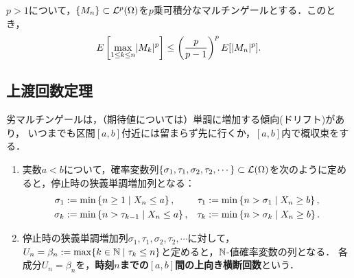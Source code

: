\documentclass[uplatex,dvipdfmx]{jsreport}
\begin{document}
\begin{proposition}
    $p>1$について，$\{M_n\}\subset\mathcal{L}^p(\Omega)$を$p$乗可積分なマルチンゲールとする．このとき，
    \[E\left[\max_{1\le k\le n}\lvert M_k\rvert^p\right]\le\left(\frac{p}{p-1}\right)^pE[\lvert M_n\rvert^p].\]
\end{proposition}

\subsection{上渡回数定理}

\begin{tcolorbox}[colframe=ForestGreen, colback=ForestGreen!10!white,breakable,colbacktitle=ForestGreen!40!white,coltitle=black,fonttitle=\bfseries\sffamily,
    title=]
    劣マルチンゲールは，（期待値については）単調に増加する傾向(ドリフト)があり，
    いつまでも区間$[a,b]$付近には留まらず先に行くか，$[a,b]$内で概収束をする．
\end{tcolorbox}

\begin{definition}\mbox{}
    \begin{enumerate}
        \item 実数$a<b$について，確率変数列$\{\sigma_1,\tau_1,\sigma_2,\tau_2,\cdots\}\subset\mathcal{L}(\Omega)$を次のように定めると，停止時の狭義単調増加列となる：
        \begin{align*}
            \sigma_1&:=\min\left\{n\ge 1\mid X_n\le a\right\},&\tau_1&:=\min\left\{n>\sigma_1\mid X_n\ge b\right\},\\
            \sigma_{k}&:=\min\left\{n>\tau_{k-1}\mid X_n\le a\right\},&\tau_{k}&:=\min\left\{n>\sigma_{k}\mid X_n\ge b\right\}.
        \end{align*}
        \item 停止時の狭義単調増加列$\sigma_1,\tau_1,\sigma_2,\tau_2,\cdots$に対して，$U_n=\beta_n:=\max\{k\in\mathbb{N}\mid\tau_{k}\le n\}$と定めると，$\mathbb{N}$-値確率変数の列となる．
        各成分$U_n=\beta_n$を，\textbf{時刻$n$までの$[a,b]$間の上向き横断回数}という．
    \end{enumerate}
\end{definition}
\end{document}
